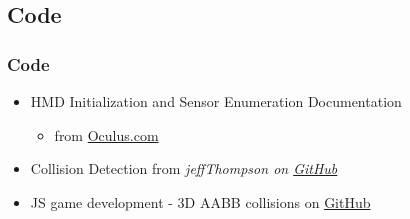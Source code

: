 \documentclass{beamer}
\begin{document}
\subsection{Code}
	\begin{frame}
	\frametitle{Code}
	\begin{itemize}
		\item HMD Initialization and Sensor Enumeration Documentation
			\begin{itemize}
				\item from \href{https://developer3.oculus.com/documentation/pcsdk/latest/concepts/dg-sensor/}{Oculus.com}
			\end{itemize}
		\item Collision Detection from \it{jeffThompson} on \href{https://github.com/jeffThompson/CollisionDetection}{GitHub}
		\item JS game development - 3D AABB collisions on \href{https://github.com/mozdevs/gamedev-js-3d-aabb}{GitHub}
	\end{itemize}
	\end{frame}
\end{document}
